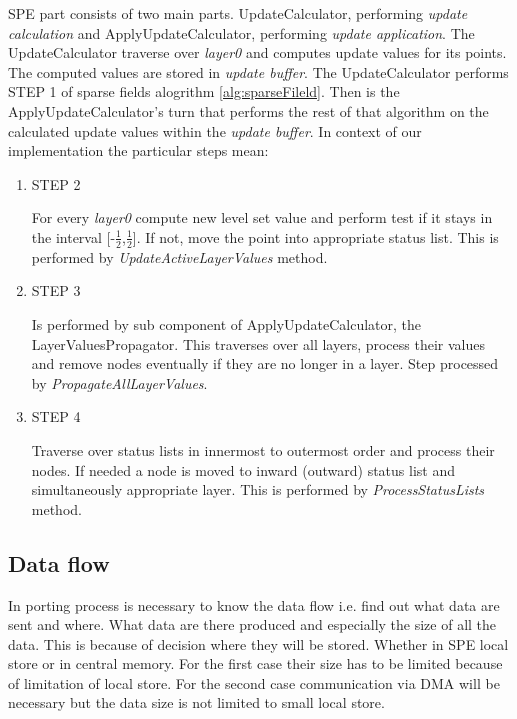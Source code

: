 SPE part consists of two main parts.
UpdateCalculator, performing \emph{update calculation} and ApplyUpdateCalculator, performing \emph{update application}.
The UpdateCalculator traverse over \emph{layer0} and computes update values for its points.
The computed values are stored in \emph{update buffer}.
The UpdateCalculator performs STEP 1 of sparse fields alogrithm \ref{alg:sparseFileld}.
Then is the ApplyUpdateCalculator's turn that performs the rest of that algorithm on the calculated update values within the \emph{update buffer}.
In context of our implementation the particular steps mean:
\begin{enumerate}
\item STEP 2
\par
For every \emph{layer0} compute new level set value and perform test if it stays in the interval [-$\frac{1}{2}$,$\frac{1}{2}$].
If not, move the point into appropriate status list.
This is performed by \emph{UpdateActiveLayerValues} method.

\item STEP 3
\par
Is performed by sub component of ApplyUpdateCalculator, the LayerValuesPropagator.
This traverses over all layers, process their values and remove nodes eventually if they are no longer in a layer.
Step processed by \emph{PropagateAllLayerValues}.

\item STEP 4
\par
Traverse over status lists in innermost to outermost order and process their nodes. 
If needed a node is moved to inward (outward) status list and simultaneously appropriate layer.
This is performed by \emph{ProcessStatusLists} method.
\end{enumerate}

\subsection{Data flow}

\par
In porting process is necessary to know the data flow i.e. find out what data are sent and where.
What data are there produced and especially the size of all the data.
This is because of decision where they will be stored.
Whether in SPE local store or in central memory.
For the first case their size has to be limited because of limitation of local store.
For the second case communication via DMA will be necessary but the data size is not limited to small local store.

